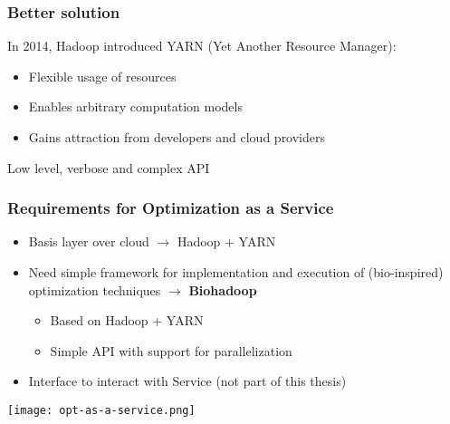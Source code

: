 \begin{frame}
  \frametitle{Better solution}
  In 2014, Hadoop introduced YARN (Yet Another Resource Manager):
  \begin{itemize}
    \item Flexible usage of resources
    \item Enables arbitrary computation models
    \item Gains attraction from developers and cloud providers
  \end{itemize}
  \vspace{1em}
  Low level, verbose and complex API
\end{frame}

\begin{frame}
  \frametitle{Requirements for Optimization as a Service}
  \begin{itemize}
    \item Basis layer over cloud $\rightarrow$ Hadoop + YARN
    \item Need simple framework for implementation and execution of (bio-inspired) optimization techniques $\rightarrow$ \textbf{Biohadoop}
    \begin{itemize}
      \item Based on Hadoop + YARN
      \item Simple API with support for parallelization
    \end{itemize}
    \item Interface to interact with Service (not part of this thesis)
  \end{itemize}
  \begin{center}
    \texttt{[image: opt-as-a-service.png]}
  \end{center}
\end{frame}